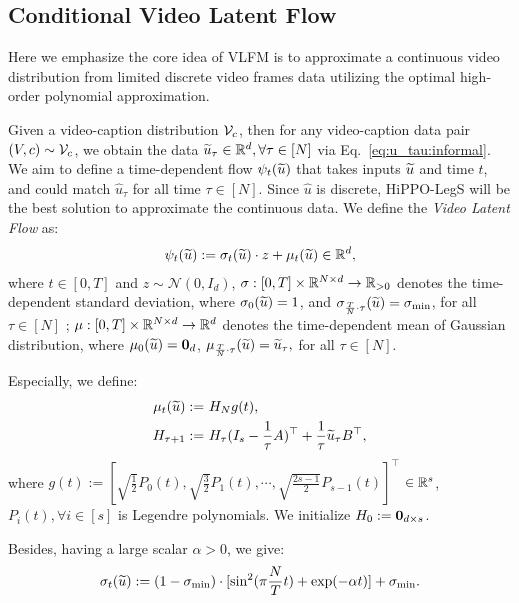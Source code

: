 \subsection{Conditional Video Latent Flow}\label{sub:vlfm}


Here we emphasize the core idea of VLFM is to approximate a continuous video distribution from limited discrete video frames data utilizing the optimal high-order polynomial approximation. 

Given a video-caption distribution ${\cal V}_c$, then for any video-caption data pair $(V, c) \sim {\cal V}_c$, we obtain the data $\widetilde{u}_\tau \in \mathbb{R}^d, \forall \tau \in [N]$ via Eq.~\eqref{eq:u_tau:informal}.
We aim to define a time-dependent flow $\psi_t(\widetilde{u})$ that takes inputs $\widetilde{u}$ and time $t$, and could match $\widehat{u}_\tau$ for all time $\tau \in [N]$. Since $\widehat{u}$ is discrete, HiPPO-LegS will be the best solution to approximate the continuous data. We define the \emph{Video Latent Flow} as:
\begin{align}\label{eq:psi}
    \psi_t(\widetilde{u}) := \sigma_t( \widetilde{u} ) \cdot z + \mu_t(\widetilde{u}) \in \mathbb{R}^d,
\end{align}
where $t \in [0,T]$ and $z \sim \mathcal{N}(0, I_d)$, $\sigma: [0, T] \times \mathbb{R}^{N \times d} \rightarrow \mathbb{R}_{> 0}$ denotes the time-dependent standard deviation, where $\sigma_0 ( \widetilde{u} ) = 1$, and $\sigma_{\frac{T}{N} \cdot \tau}( \widetilde{u} ) = \sigma_{\min}$, for all $\tau \in [N]$ ; $\mu: [0, T] \times \mathbb{R}^{N \times d} \rightarrow \mathbb{R}^d$ denotes the time-dependent mean of Gaussian distribution, where $\mu_0(\widetilde{u}) = {\bf 0}_d$, $\mu_{\frac{T}{N} \cdot \tau}(\widetilde{u}) = \widetilde{u}_\tau,$ for all $\tau \in [N]$.

Especially, we define:
\begin{align*}
    \mu_t(\widetilde{u} ) := & ~  H_N g(t), \\
    H_{\tau + 1} := & ~ H_{\tau} (I_s - \frac{1}{\tau} A)^\top + \frac{1}{\tau} \widetilde{u}_\tau B^\top,
\end{align*}
where $g(t) := [\sqrt{\frac{1}{2}} P_0(t), \sqrt{\frac{3}{2}} P_1(t), \cdots, \sqrt{\frac{2s-1}{2}} P_{s-1}(t)]^\top $ $\in \mathbb{R}^{s}$, $P_i(t), \forall i \in [s]$ is Legendre polynomials. We initialize $H_0 := {\bf 0}_{d \times s}$.

Besides, having a large scalar $\alpha > 0$, we give:
\begin{align*}
    \sigma_t(\widetilde{u}) := (1 - \sigma_{\min}) \cdot [\sin^2( \pi \frac{N}{T} t ) +  \exp(-\alpha t) ] + \sigma_{\min}.
\end{align*}

